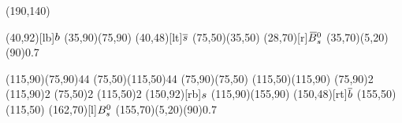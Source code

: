 \documentclass{standalone}
\begin{document}
\begin{axopicture}(190,140)

  \Text(40,92)[lb]{${b}$}       %
  \Line[arrow](35,90)(75,90)        %
  \Text(40,48)[lt]{${\overline {{s}}}$}    %
  \Line[arrow](75,50)(35,50)        %
  \Text(28,70)[r]{${{\kern 0.18em\overline{\kern -0.18em B}}{}^0_{s}}$}           %
  \GOval(35,70)(5,20)(90){0.7}      %
                                    
  \Photon(115,90)(75,90){4}{4}      %
  \Photon(75,50)(115,50){4}{4}      %
  \Line[arrow](75,90)(75,50)        %
  \Line[arrow](115,50)(115,90)      %
  \Vertex(75,90){2}                 %
  \Vertex(115,90){2}                %
  \Vertex(75,50){2}                 %
  \Vertex(115,50){2}                %
  \Text(150,92)[rb]{${s}$}      %
  \Line[arrow](115,90)(155,90)      %
  \Text(150,48)[rt]{${\overline {{b}}}$}   %
  \Line[arrow](155,50)(115,50)      %
  \Text(162,70)[l]{${{B}^0_{s}}$}           %
  \GOval(155,70)(5,20)(90){0.7}     %
                                    
\end{axopicture}
\end{document}
